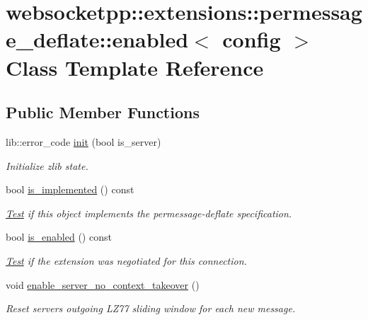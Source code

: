 \hypertarget{classwebsocketpp_1_1extensions_1_1permessage__deflate_1_1enabled}{}\section{websocketpp\+:\+:extensions\+:\+:permessage\+\_\+deflate\+:\+:enabled$<$ config $>$ Class Template Reference}
\label{classwebsocketpp_1_1extensions_1_1permessage__deflate_1_1enabled}
\subsection*{Public Member Functions}
\begin{DoxyCompactItemize}
\item 
lib\+::error\+\_\+code \mbox{\hyperlink{classwebsocketpp_1_1extensions_1_1permessage__deflate_1_1enabled_a0d842cb0cd2add8016e739dfcd675ba0}{init}} (bool is\+\_\+server)
\begin{DoxyCompactList}\small\item\em Initialize zlib state. \end{DoxyCompactList}\item 
bool \mbox{\hyperlink{classwebsocketpp_1_1extensions_1_1permessage__deflate_1_1enabled_a76a196b1428865e739fe99e951f03e68}{is\+\_\+implemented}} () const
\begin{DoxyCompactList}\small\item\em \mbox{\hyperlink{struct_test}{Test}} if this object implements the permessage-\/deflate specification. \end{DoxyCompactList}\item 
bool \mbox{\hyperlink{classwebsocketpp_1_1extensions_1_1permessage__deflate_1_1enabled_a5190a82b1571a94704cef6959ed78ce2}{is\+\_\+enabled}} () const
\begin{DoxyCompactList}\small\item\em \mbox{\hyperlink{struct_test}{Test}} if the extension was negotiated for this connection. \end{DoxyCompactList}\item 
void \mbox{\hyperlink{classwebsocketpp_1_1extensions_1_1permessage__deflate_1_1enabled_a9275c22cfd6782ef72a722168d663d8b}{enable\+\_\+server\+\_\+no\+\_\+context\+\_\+takeover}} ()
\begin{DoxyCompactList}\small\item\em Reset server\textquotesingle{}s outgoing L\+Z77 sliding window for each new message. \end{DoxyCompactList}\item 

\end{DoxyCompactItemize}
